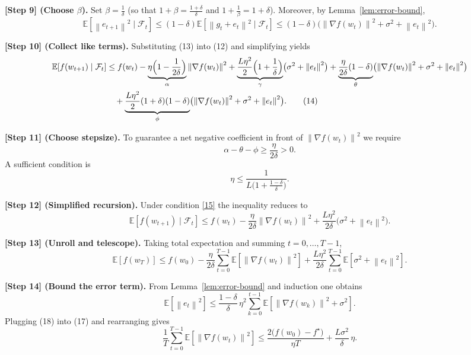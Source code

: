 \documentclass{article}
\newcommand{\E}{\mathbb{E}}
\newcommand{\norm}[1]{\left\|#1\right\|}
\begin{document}
\noindent\textbf{[Step 9] (Choose $\beta$).} Set $\beta=\frac{1}{\delta}$ (so that $1+\beta=\frac{1+\delta}{\delta}$ and $1+\frac{1}{\beta}=1+\delta$). Moreover, by Lemma~\ref{lem:error-bound},
\[
\E\!\left[\norm{e_{t+1}}^{2}\mid\mathcal{F}_{t}\right]\le(1-\delta)\E\!\left[\norm{g_{t}+e_{t}}^{2}\mid\mathcal{F}_{t}\right]
\le(1-\delta)\bigl(\norm{\nabla f(w_{t})}^{2}+\sigma^{2}+\norm{e_{t}}^{2}\bigr). \tag{13}
\]

\noindent\textbf{[Step 10] (Collect like terms).} Substituting (13) into (12) and simplifying yields
\begin{align}
\E\!\left[f(w_{t+1})\mid\mathcal{F}_{t}\right]
&\le f(w_{t})
-\underbrace{\eta\Bigl(1-\frac{1}{2\delta}\Bigr)}_{\alpha}\norm{\nabla f(w_{t})}^{2}
+\underbrace{\frac{L\eta^{2}}{2}\Bigl(1+\frac{1}{\delta}\Bigr)}_{\gamma}\bigl(\sigma^{2}+\norm{e_{t}}^{2}\bigr)
+\underbrace{\frac{\eta}{2\delta}(1-\delta)}_{\theta}\bigl(\norm{\nabla f(w_{t})}^{2}+\sigma^{2}+\norm{e_{t}}^{2}\bigr)
\nonumber\\
&\quad+\underbrace{\frac{L\eta^{2}}{2}(1+\delta)(1-\delta)}_{\phi}\bigl(\norm{\nabla f(w_{t})}^{2}+\sigma^{2}+\norm{e_{t}}^{2}\bigr). \tag{14}
\end{align}

\noindent\textbf{[Step 11] (Choose stepsize).} To guarantee a net negative coefficient in front of $\norm{\nabla f(w_{t})}^{2}$ we require
\[
\alpha-\theta-\phi\ge \frac{\eta}{2\delta}>0.
\]
A sufficient condition is
\[
\eta\le\frac{1}{L\bigl(1+\frac{1-\delta}{\delta}\bigr)}. \tag{15}
\]

\noindent\textbf{[Step 12] (Simplified recursion).} Under condition \eqref{15} the inequality reduces to
\[
\E\!\left[f(w_{t+1})\mid\mathcal{F}_{t}\right]
\le f(w_{t})-\frac{\eta}{2\delta}\norm{\nabla f(w_{t})}^{2}
+\frac{L\eta^{2}}{2\delta}\bigl(\sigma^{2}+\norm{e_{t}}^{2}\bigr). \tag{16}
\]

\noindent\textbf{[Step 13] (Unroll and telescope).} Taking total expectation and summing $t=0,\dots,T-1$,
\[
\E[f(w_{T})]\le f(w_{0})
-\frac{\eta}{2\delta}\sum_{t=0}^{T-1}\E\!\left[\norm{\nabla f(w_{t})}^{2}\right]
+\frac{L\eta^{2}}{2\delta}\sum_{t=0}^{T-1}\E\!\left[\sigma^{2}+\norm{e_{t}}^{2}\right]. \tag{17}
\]

\noindent\textbf{[Step 14] (Bound the error term).} From Lemma~\ref{lem:error-bound} and induction one obtains
\[
\E\!\left[\norm{e_{t}}^{2}\right]\le\frac{1-\delta}{\delta}\,\eta^{2}\sum_{k=0}^{t-1}\E\!\left[\norm{\nabla f(w_{k})}^{2}+\sigma^{2}\right]. \tag{18}
\]
Plugging (18) into (17) and rearranging gives
\[
\frac{1}{T}\sum_{t=0}^{T-1}\E\!\left[\norm{\nabla f(w_{t})}^{2}\right]
\le\frac{2\bigl(f(w_{0})-f^{\star}\bigr)}{\eta T}
+\frac{L\sigma^{2}}{\delta}\,\eta.
\tag{19}
\]
\end{document}
